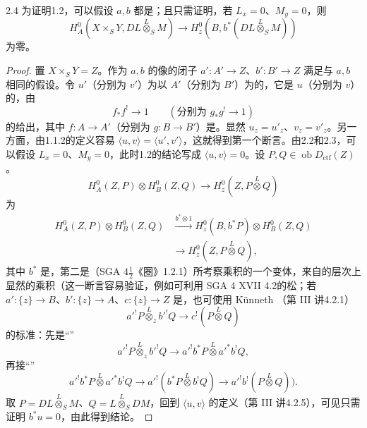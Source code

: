 \begin{SGAresult}{}{2.4}
为证明1.2，可以假设 $a,b$ 都是；且只需证明，若 $L_x=0$、$M_y=0$，则
\[
 H_A^0(X\times_S Y,DL\overset L\otimes_S M)\longrightarrow
 H_z^0(B,b^*(DL\overset L\otimes_S M))\tag{2.4.1}
\]
为零。
\end{SGAresult}
\begin{proof}
置 $X\times_S Y=Z$。作为 $a,b$ 的像的闭子 $a':A'\to Z$、$b':B'\to Z$ 满足与 $a,b$ 相同的假设。令 $u'$（分别为 $v'$）为以 $A'$（分别为 $B'$）为的，它是 $u$（分别为 $v$）的，由
\[
 f_*f^!\longrightarrow1\qquad(\text{分别为 }g_*g^!\longrightarrow1)
\]
的给出，其中 $f:A\to A'$（分别为 $g:B\to B'$）是。显然 $u_z=u'_z$、$v_z=v'_z$。另一方面，由1.1.2的定义容易 $\langle u,v\rangle=\langle u',v'\rangle$，这就得到第一个断言。由2.2和2.3，可以假设 $L_x=0$、$M_y=0$，此时1.2的结论写成 $\langle u,v\rangle=0$。设 $P,Q\in\operatorname{ob}D_{\mathrm{ctf}}(Z)$。
\[
 H_A^0(Z,P)\otimes H_B^0(Z,Q)\longrightarrow H_z^0(Z,P\overset L\otimes Q)
\]
为
\[
 \begin{aligned}
 H_A^0(Z,P)\otimes H_B^0(Z,Q)&\xrightarrow{b^*\otimes1}
 H_z^0(B,b^*P)\otimes H_B^0(Z,Q)\\
 &\longrightarrow H_z^0(Z,P\overset L\otimes Q),
 \end{aligned}
\]
其中 $b^*$ 是，第二是（SGA $4\frac12$《圈》1.2.1）所考察乘积的一个变体，来自的层次上显然的乘积（这一断言容易验证，例如可利用 SGA 4 XVII 4.2的松；若 $a':\{z\}\to B$、$b':\{z\}\to A$、$c:\{z\}\to Z$ 是，也可使用 Künneth （第 III 讲4.2.1）
\[
 a'^!P\overset L\otimes_z b'^!Q\longrightarrow c^!(P\overset L\otimes Q)
\]
的标准：先是“”
\[
 a'^!P\overset L\otimes_z b'^!Q\longrightarrow
 a'^!b^*P\overset L\otimes a'^*b^!Q,
\]
再接“”
\[
 a'^!b^*P\overset L\otimes a'^*b^!Q\longrightarrow
 a'^!(b^*P\overset L\otimes b^!Q)\longrightarrow
 a'^!b^!(P\overset L\otimes Q)).
\]
取 $P=DL\overset L\otimes_S M$、$Q=L\overset L\otimes_S DM$，回到 $\langle u,v\rangle$ 的定义（第 III 讲4.2.5），可见只需证明 $b^*u=0$，由此得到结论。
\end{proof}

